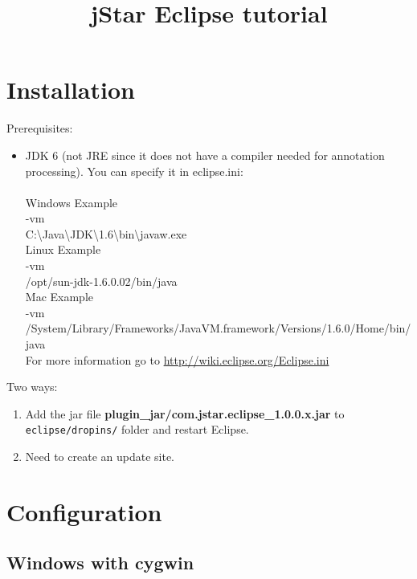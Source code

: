 \documentclass{article}
\begin{document}
\title{jStar Eclipse tutorial} 
\maketitle 


\section{Installation}

Prerequisites:
\begin{itemize}
   \item JDK 6 (not JRE since it does not have a compiler needed for annotation processing). You can specify it in eclipse.ini:\\\\
Windows Example\\
-vm\\
C:\textbackslash Java\textbackslash JDK\textbackslash 1.6\textbackslash bin\textbackslash javaw.exe\\

Linux Example\\
-vm\\
/opt/sun-jdk-1.6.0.02/bin/java\\

Mac Example\\
-vm\\
/System/Library/Frameworks/JavaVM.framework/Versions/1.6.0/Home/bin/java\\

For more information go to \href{http://wiki.eclipse.org/Eclipse.ini}{http://wiki.eclipse.org/Eclipse.ini}

\end{itemize}
Two ways:
\begin{enumerate}
\item Add the jar file \textbf{plugin\_jar/com.jstar.eclipse\_1.0.0.x.jar} to \texttt{eclipse/dropins/} folder and restart Eclipse.
\item {\color{red} Need to create an update site.}
\end{enumerate}

\section{Configuration}

\subsection{Windows with cygwin}
\end{document}

